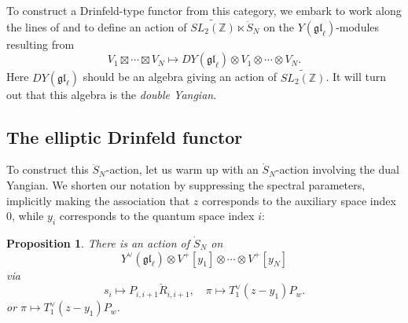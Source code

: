 \documentclass[11pt]{report}
\newtheorem{prop}[theorem]{Proposition}
\theoremstyle{definition}
\theoremstyle{remark}
\theoremstyle{remark}
\newcommand{\Z}{\mathbb{Z}}
\begin{document}
To construct a Drinfeld-type functor from this category, we embark to work along the lines of \cite{article:benzvi:2018} and \cite{article:brochier:2017} to define an action of $\widetilde{SL_2(\Z)} \ltimes \ddot S_N$ on the $Y(\mathfrak{gl}_\ell)$-modules resulting from
\begin{equation*}
V_1 \boxtimes \cdots \boxtimes V_N \mapsto DY(\mathfrak{gl}_\ell) \otimes V_1 \otimes \cdots \otimes V_N.
\end{equation*}
Here $DY(\mathfrak{gl}_\ell)$ should be an algebra giving an action of $\widetilde{SL_2(\Z)}$. It will turn out that this algebra is the \emph{double Yangian}.

\subsection{The elliptic Drinfeld functor}

To construct this $\ddot S_N$-action, let us warm up with an $\dot S_N$-action involving the dual Yangian. We shorten our notation by suppressing the spectral parameters, implicitly making the association that $z$ corresponds to the auxiliary space index $0$, while $y_i$ corresponds to the quantum space index $i$:

\begin{prop}
There is an action of $\dot S_N$ on
\begin{equation*}
Y^\vee(\mathfrak{gl}_\ell) \otimes V^+[y_1] \otimes \cdots \otimes V^+[y_N]
\end{equation*}
via
\begin{equation*}
s_i \mapsto P_{i,i+1} \check R_{i,i+1}, \quad \pi \mapsto T_1^\vee(z-y_1) P_w.
\end{equation*}
or $\pi \mapsto T_1^\vee(z-y_1) P_w$.
\end{prop}
\end{document}
